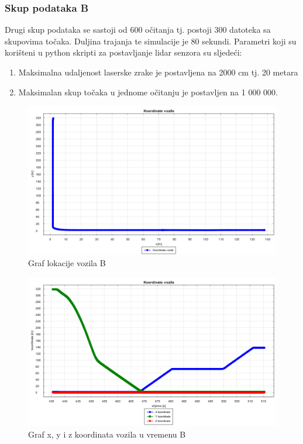 \subsubsection{Skup podataka B}
Drugi skup podataka se sastoji od 600 očitanja tj. postoji 300 datoteka sa skupovima točaka. Duljina trajanja te simulacije je 80 sekundi. Parametri koji su korišteni u python skripti za postavljanje lidar senzora su sljedeći:
\begin{enumerate}
  \item Maksimalna udaljenost laserske zrake je postavljena na 2000 cm tj. 20 metara
  \item Maksimalan skup točaka u jednome očitanju je postavljen na 1 000 000.
\end{enumerate}
\begin{figure}[H]
  \includegraphics[scale=0.35]{images/koordinate2.png}
  \caption{Graf lokacije vozila B}
  \label{fig:gt2_lokacija}
\end{figure}
\begin{figure}[H]
  \includegraphics[scale=0.35]{images/koordinate_vrijeme2.png}
  \caption{Graf x, y i z koordinata vozila u vremenu B}
  \label{fig:gt2_lokacija_koord}
\end{figure}
